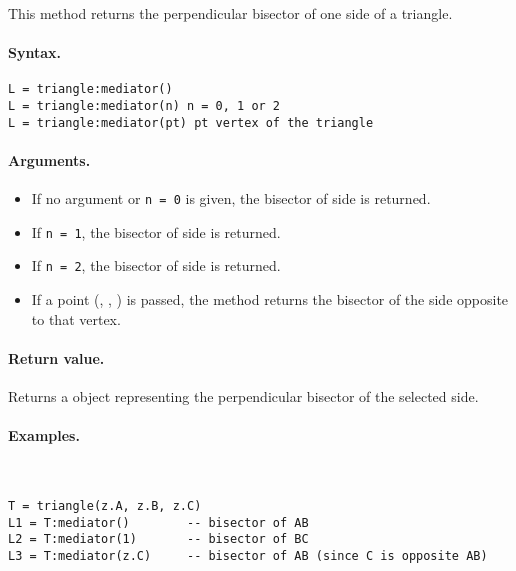 This method returns the perpendicular bisector of one side of a triangle.

\paragraph{Syntax.}
\begin{verbatim}
L = triangle:mediator()
L = triangle:mediator(n) n = 0, 1 or 2
L = triangle:mediator(pt) pt vertex of the triangle
\end{verbatim}

\paragraph{Arguments.}

\begin{itemize}
  \item If no argument or \texttt{n = 0} is given, the bisector of side  is returned.
  \item If \texttt{n = 1}, the bisector of side  is returned.
  \item If \texttt{n = 2}, the bisector of side  is returned.
  \item If a point (, , ) is passed, the method returns the bisector of the side opposite to that vertex.
\end{itemize}

\paragraph{Return value.}

Returns a  object representing the perpendicular bisector of the selected side.

\paragraph{Examples.}\mbox{}\\

\begin{mybox}
\begin{verbatim}
T = triangle(z.A, z.B, z.C)
L1 = T:mediator()        -- bisector of AB
L2 = T:mediator(1)       -- bisector of BC
L3 = T:mediator(z.C)     -- bisector of AB (since C is opposite AB)
\end{verbatim}
\end{mybox}


\begin{tkzexample}[latex=.55\textwidth]
\begin{center}
\end{center}
\end{tkzexample}



